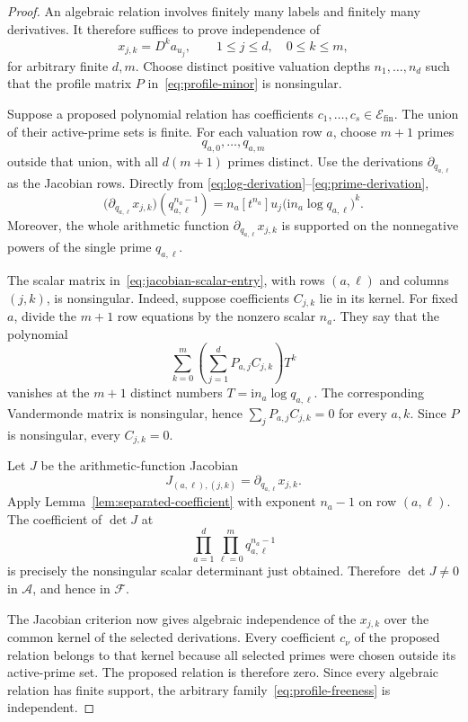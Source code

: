 \documentclass[11pt]{article}
\theoremstyle{definition}
\theoremstyle{remark}
\newcommand{\A}{\mathcal A}
\newcommand{\F}{\mathcal F}
\newcommand{\Efin}{\mathcal E_{\mathrm{fin}}}
\begin{document}
\begin{proof}
An algebraic relation involves finitely many labels and finitely many derivatives.  It therefore
suffices to prove independence of
\[
 x_{j,k}=D^ka_{u_j},
 \qquad 1\le j\le d,\quad 0\le k\le m,
\]
for arbitrary finite $d,m$.  Choose distinct positive valuation depths $n_1,\ldots,n_d$ such that the
profile matrix $P$ in~\eqref{eq:profile-minor} is nonsingular.

Suppose a proposed polynomial relation has coefficients $c_1,\ldots,c_s\in\Efin$.  The union of
their active-prime sets is finite.  For each valuation row $a$, choose $m+1$ primes
\[
 q_{a,0},\ldots,q_{a,m}
\]
outside that union, with all $d(m+1)$ primes distinct.  Use the derivations
$\partial_{q_{a,\ell}}$ as the Jacobian rows.  Directly from
\eqref{eq:log-derivation}--\eqref{eq:prime-derivation},
\begin{equation}\label{eq:jacobian-scalar-entry}
 \bigl(\partial_{q_{a,\ell}}x_{j,k}\bigr)(q_{a,\ell}^{n_a-1})
 =n_a[t^{n_a}]u_j
   \bigl(\mathrm i n_a\log q_{a,\ell}\bigr)^k.
\end{equation}
Moreover, the whole arithmetic function
$\partial_{q_{a,\ell}}x_{j,k}$ is supported on the nonnegative powers of the single prime
$q_{a,\ell}$.

The scalar matrix in~\eqref{eq:jacobian-scalar-entry}, with rows $(a,\ell)$ and columns $(j,k)$,
is nonsingular.  Indeed, suppose coefficients $C_{j,k}$ lie in its kernel.  For fixed $a$, divide
the $m+1$ row equations by the nonzero scalar $n_a$.  They say that the polynomial
\[
 \sum_{k=0}^m\left(\sum_{j=1}^dP_{a,j}C_{j,k}\right)T^k
\]
vanishes at the $m+1$ distinct numbers
$T=\mathrm i n_a\log q_{a,\ell}$.  The corresponding Vandermonde matrix is nonsingular, hence
$\sum_jP_{a,j}C_{j,k}=0$ for every $a,k$.  Since $P$ is nonsingular, every $C_{j,k}=0$.

Let $J$ be the arithmetic-function Jacobian
\[
 J_{(a,\ell),(j,k)}=\partial_{q_{a,\ell}}x_{j,k}.
\]
Apply Lemma~\ref{lem:separated-coefficient} with exponent $n_a-1$ on row $(a,\ell)$.  The coefficient
of $\det J$ at
\[
 \prod_{a=1}^d\prod_{\ell=0}^m q_{a,\ell}^{n_a-1}
\]
is precisely the nonsingular scalar determinant just obtained.  Therefore $\det J\ne0$ in
$\A$, and hence in $\F$.

The Jacobian criterion now gives algebraic independence of the $x_{j,k}$ over the common kernel
of the selected derivations.  Every coefficient $c_\nu$ of the proposed relation belongs to that
kernel because all selected primes were chosen outside its active-prime set.  The proposed
relation is therefore zero.  Since every algebraic relation has finite support, the arbitrary
family~\eqref{eq:profile-freeness} is independent.
\end{proof}
\end{document}
